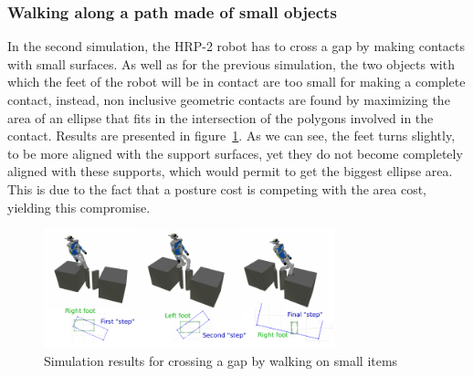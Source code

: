 
\subsubsection{Walking along a path made of small objects}
\label{subsubsec:riviere}

In the second simulation, the HRP-2 robot has to cross a gap by making contacts
with small surfaces.
As well as for the previous simulation, the two objects
with which the feet of the robot will be in contact are too small for making a
complete contact, instead, non inclusive geometric contacts are found by
maximizing the area of an ellipse that fits in the intersection of the polygons
involved in the contact.
Results are presented in figure~\ref{fig:riviere}.
As we can see, the feet turns slightly, to be more aligned with the support
surfaces, yet they do not become completely aligned with these supports, which would permit to get the biggest ellipse area.
This is due to the fact that a posture cost is competing with the area cost, yielding this compromise.

\begin{figure}[!htb]
  \centering
  \includegraphics[width=0.75\textwidth]{riviere3steps.pdf}
  \caption{Simulation results for crossing a gap by walking on small items}
\label{fig:riviere}
\end{figure}

